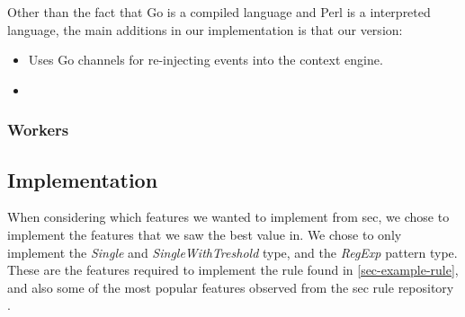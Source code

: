 \iffalse
\section{The Go programming language}

This will not be an extensive intro to Go, the interested reader is referred to \textcite{golang} for further details.

\com{Her er en rask intro, argumentasjonen hvorfor vi valgte dette finner du i eksperiment XYZ}
\todo{Why did we choose Go?} \com{Dette er ikke teori/bakgrunn, men mer et metodevalg.}
\subsection{Goroutines}
\todo{What are these lightweight Go threads?}\\
Goroutines are lightweight threads that are handled by the Go runtime.
\subsection{Channels}
The use of channels and goroutines gives us the ability to run in a threaded matter, utilizing multiple cores.
\todo{What are channels? What are some of the considerations we have to take when working with them?}\\
\todo{Are there any best practices?}\\
Channels are the preferred way to communicate between Goroutines in Go.

\subsection{Concurrency vs parallelism}
\todo{Discuss why Go is concurrent, but not parallel}
\fi


Other than the fact that Go is a compiled language and Perl is a interpreted language, the main additions in our implementation is that our version:
\begin{itemize}
    \item Uses Go channels for re-injecting events into the context engine.
    \item 
\end{itemize}

\subsubsection{Workers}


\subsection{Implementation}
When considering which features we wanted to implement from \acrshort{sec}, we chose to implement the features that we saw the best value in. We chose to only implement the \textit{Single} and \textit{SingleWithTreshold} type, and the \textit{RegExp} pattern type. These are the features required to implement the rule found in \cref{sec-example-rule}, and also some of the most popular features observed from the \acrshort{sec} rule repository \cite{sec-rulesets}.

